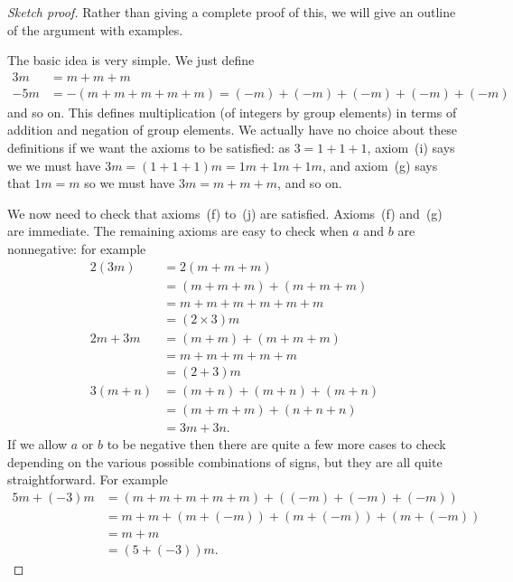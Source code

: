 \documentclass{amsart}
\newcommand{\tm}        {\times}
\renewcommand{\:}{\colon}
\theoremstyle{definition}
\begin{document}
\begin{proof}[Sketch proof]
 Rather than giving a complete proof of this, we will give an outline
 of the argument with examples.

 The basic idea is very simple.  We just define
 \begin{align*}
  3m  &= m + m + m\\
  -5m &= - (m+m+m+m+m) = (-m) + (-m) + (-m) + (-m) + (-m) 
 \end{align*}
 and so on.  This defines multiplication (of integers by group
 elements) in terms of addition and negation of group elements.  We
 actually have no choice about these definitions if we want the axioms
 to be satisfied: as $3=1+1+1$, axiom~(i) says we we must have
 $3m=(1+1+1)m=1m+1m+1m$, and axiom~(g) says that $1m=m$ so we must have
 $3m=m+m+m$, and so on.

 We now need to check that axioms~(f) to~(j) are satisfied.
 Axioms~(f) and~(g) are immediate.  The remaining axioms are easy to
 check when $a$ and $b$ are nonnegative: for example
 \begin{align*}
  2(3m) &= 2(m+m+m) \\
        &= (m+m+m)+(m+m+m) \\
        &= m+m+m+m+m+m \\
        &= (2\tm 3)m \\
  2m+3m &= (m+m)+(m+m+m) \\
        &= m+m+m+m+m \\
        &= (2+3)m \\
  3(m+n)&= (m+n) + (m+n) + (m+n) \\
        &= (m+m+m) + (n+n+n) \\
        &= 3m + 3n.
 \end{align*}
 If we allow $a$ or $b$ to be negative then there are quite a few more
 cases to check depending on the various possible combinations of
 signs, but they are all quite straightforward.  For example
 \begin{align*}
  5m + (-3)m &= (m+m+m+m+m) + ((-m)+(-m)+(-m)) \\
             &= m + m + (m+(-m)) + (m+(-m)) + (m+(-m)) \\
             &= m + m \\
             &= (5 + (-3)) m.
 \end{align*}
\end{proof}
\end{document}
